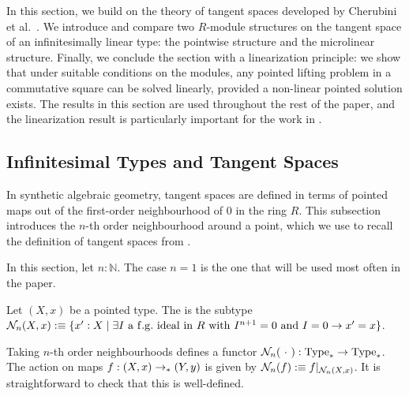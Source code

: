 In this section, we build on the theory of tangent spaces developed by Cherubini et al.~\cite{diffgeo-article}.
We introduce and compare two $R$-module structures on the tangent space of an infinitesimally linear type: the pointwise structure and the microlinear structure.
Finally, we conclude the section with a linearization principle: we show that under suitable conditions on the modules, any pointed lifting problem in a commutative square can be solved linearly, provided a non-linear pointed solution exists.
The results in this section are used throughout the rest of the paper, and the linearization result is particularly important for the work in .

\subsection{Infinitesimal Types and Tangent Spaces}

In synthetic algebraic geometry, tangent spaces are defined in terms of pointed maps out of the first-order neighbourhood of $0$ in the ring $R$.
This subsection introduces the $n$-th order neighbourhood around a point, which we use to recall the definition of tangent spaces from \cite{diffgeo-article}.

In this section, let $n : \mathbb{N}$.  The case $n = 1$ is the one that will be used
most often in the paper.

\begin{definition}\label{def:hood-res}
  Let $(X,x)$ be a pointed type.
  The  is the subtype $\hood{X,x}{n} \defeq \setbuild{x' : X}{\exists I\ \mathrm{a\ f.g.\ ideal\ in}\ R\ \mathrm{with}\ I^{n+1} = 0\ \mathrm{and}\ I = 0 \rightarrow x' = x}$.
\end{definition}

Taking $n$-th order neighbourhoods defines a functor $\hood{\argmhole}{n} : \pType \rightarrow \pType$.
The action on maps $f : (X,x) \pto (Y,y)$ is given by $\hood{f}{n} \defeq f|_{\hood{X,x}{n}}$.
It is straightforward to check that this is well-defined.

%

